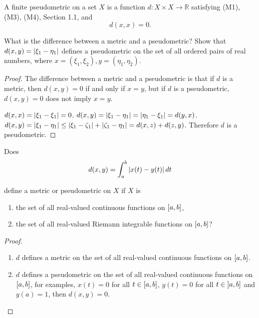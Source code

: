 \begin{exercise}[Pseudometric]\label{chapter1:section6:exercise13}
    A finite pseudometric on a set $X$ is a function $d: X \times X \to \mathbb{R}$ satisfying (M1), (M3), (M4), Section 1.1, and
    \[
        d(x, x) = 0.
    \]

    What is the difference between a metric and a pseudometric? Show that $d(x, y) = \left\vert{\xi_{1} - \eta_{1}}\right\vert$ defines a pseudometric on the set of all ordered pairs of real numbers, where $x = (\xi_{1}, \xi_{2}), y = (\eta_{1}, \eta_{2})$.
\end{exercise}

\begin{proof}
    The difference between a metric and a pseudometric is that if $d$ is a metric, then $d(x, y) = 0$ if and only if $x = y$, but if $d$ is a pseudometric, $d(x, y) = 0$ does not imply $x = y$.

    $d(x, x) = \left\vert{\xi_{1} - \xi_{1}}\right\vert = 0$. $d(x, y) = \left\vert{\xi_{1} - \eta_{1}}\right\vert = \left\vert{\eta_{1} - \xi_{1}}\right\vert = d(y, x)$. $d(x, y) = \left\vert{\xi_{1} - \eta_{1}}\right\vert\leq \left\vert{\xi_{1} - \zeta_{1}}\right\vert + \left\vert{\zeta_{1} - \eta_{1}}\right\vert = d(x, z) + d(z, y)$. Therefore $d$ is a pseudometric.
\end{proof}

\begin{exercise}\label{chapter1:section6:exercise14}
    Does
    \[
        d(x, y) = \int^{b}_{a}\left\vert{x(t) - y(t)}\right\vert dt
    \]

    define a metric or pseudometric on $X$ if $X$ is
    \begin{enumerate}[label={(\alph*)}]
        \item the set of all real-valued continuous functions on $\left[{a,b}\right]$,
        \item the set of all real-valued Riemann integrable functions on $\left[{a, b}\right]$?
    \end{enumerate}
\end{exercise}

\begin{proof}
    \begin{enumerate}[label={(\alph*)}]
        \item $d$ defines a metric on the set of all real-valued continuous functions on $\left[{a, b}\right]$.
        \item $d$ defines a pseudometric on the set of all real-valued continuous functions on $\left[{a, b}\right]$, for examples, $x(t) = 0$ for all $t\in\left[{a, b}\right]$, $y(t) = 0$ for all $t\in\left]{a, b}\right]$ and $y(a) = 1$, then $d(x, y) = 0$.
    \end{enumerate}
\end{proof}

